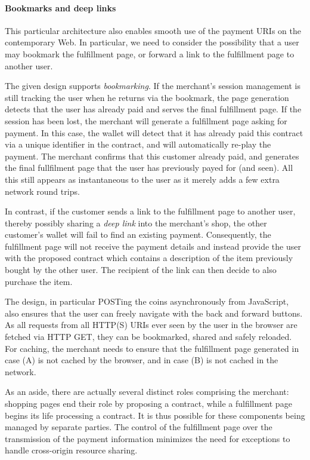 \documentclass{IEEEtran}
\begin{document}
\paragraph{Bookmarks and deep links}

This particular architecture also enables smooth use of the payment
URIs on the contemporary Web.  In particular, we need to consider the
possibility that a user may bookmark the fulfillment page, or forward
a link to the fulfillment page to another user.

The given design supports {\em bookmarking}. If the merchant's
session management is still tracking the user when he returns via the
bookmark, the page generation detects that the user has already paid
and serves the final fulfillment page.  If the session has been lost,
the merchant will generate a fulfillment page asking for payment.  In
this case, the wallet will detect that it has already paid this
contract via a unique identifier in the contract, and will
automatically re-play the payment.  The merchant confirms that this
customer already paid, and generates the final fullfilment page that the
user has previously payed for (and seen).  All this still appears as
instantaneous to the user as it merely adds a few extra network round trips.

In contrast, if the customer sends a link to the fulfillment page to
another user, thereby possibly sharing a {\em deep link} into the
merchant's shop, the other customer's wallet will fail to find an
existing payment.  Consequently, the fulfillment page will not receive
the payment details and instead provide the user with the proposed
contract which contains a description of the item previously bought by
the other user. The recipient of the link can then decide to also
purchase the item.

The design, in particular POSTing the coins asyn\-chro\-nous\-ly from
JavaScript, also ensures that the user can freely navigate with
the back and forward buttons.  As all requests from all HTTP(S)
URIs ever seen by the user in the browser are fetched via HTTP
GET, they can be bookmarked, shared and safely reloaded.  For
caching, the merchant needs to ensure that the fulfillment
page generated in case (A) is not cached by the browser,
and in case (B) is not cached in the network.

As an aside, there are actually several distinct roles comprising the
merchant: shopping pages end their role by proposing a contract, while
a fulfillment page begins its life processing a contract.  It is thus
possible for these components being managed by separate parties. The
control of the fulfillment page over the transmission of the payment
information minimizes the need for exceptions to handle cross-origin
resource sharing.~\cite{rfc6454,cors}
\end{document}
